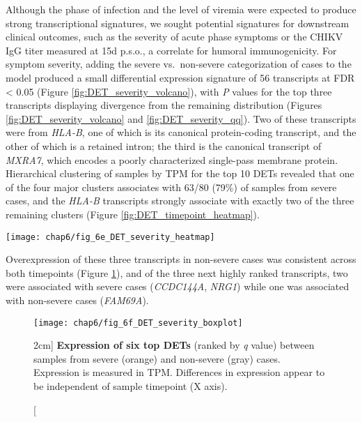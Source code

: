 Although the phase of infection and the level of viremia were expected to produce strong transcriptional signatures, we sought potential signatures for downstream clinical outcomes, such as the severity of acute phase symptoms or the CHIKV IgG titer measured at 15d p.s.o., a correlate for humoral immunogenicity. For symptom severity, adding the severe vs.\ non-severe categorization of cases to the model produced a small differential expression signature of 56 transcripts at FDR < 0.05 (Figure \ref{fig:DET_severity_volcano}), with \emph{P} values for the top three transcripts displaying divergence from the remaining distribution (Figures \ref{fig:DET_severity_volcano} and \ref{fig:DET_severity_qq}). Two of these transcripts were from \emph{HLA-B}, one of which is its canonical protein-coding transcript, and the other of which is a retained intron; the third is the canonical transcript of \emph{MXRA7}, which encodes a poorly characterized single-pass membrane protein. Hierarchical clustering of samples by TPM for the top 10 DETs revealed that one of the four major clusters associates with 63/80 (79\%) of samples from severe cases, and the \emph{HLA-B} transcripts strongly associate with exactly two of the three remaining clusters (Figure \ref{fig:DET_timepoint_heatmap}).
\begin{figure*}[htb]
  \centering
  \texttt{[image: chap6/fig\_6e\_DET\_severity\_heatmap]}
  \caption[Top 10 differentially expressed host transcripts for CHIKV symptom severity]{
  \textbf{Heatmap of DET expression} as in Figure \ref{fig:DET_timepoint_heatmap} but for the top 10 DETs between samples from severe and non-severe cases. Four major clusters of samples are highlighted.
  }
  \label{fig:DET_severity_heatmap}
\end{figure*}
Overexpression of these three transcripts in non-severe cases was consistent across both timepoints (Figure \ref{fig:DET_severity_boxplot}), and of the three next highly ranked transcripts, two were associated with severe cases (\emph{CCDC144A}, \emph{NRG1}) while one was associated with non-severe cases (\emph{FAM69A}).

\begin{figure}[htb]
  \centering
  \texttt{[image: chap6/fig\_6f\_DET\_severity\_boxplot]}
  \caption[Differential expression of severity DETs holds across both timepoints][2cm]{
  \textbf{Expression of six top DETs} (ranked by \emph{q} value) between samples from severe (orange) and non-severe (gray) cases. Expression is measured in TPM. Differences in expression appear to be independent of sample timepoint (X axis). 
  }
  \label{fig:DET_severity_boxplot}
\end{figure}

